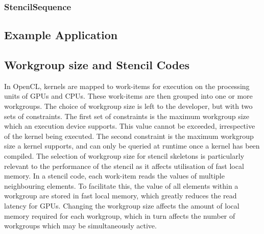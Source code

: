 


\subsubsection{StencilSequence}



\subsection{Example Application}



\subsection{Workgroup size and Stencil Codes}


In OpenCL, kernels are mapped to work-items for execution on the
processing units of GPUs and CPUs. These work-items are then grouped
into one or more workgroups. The choice of workgroup size is left to
the developer, but with two sets of constraints. The first set of
constraints is the maximum workgroup size which an execution device
supports. This value cannot be exceeded, irrespective of the kernel
being executed. The second constraint is the maximum workgroup size a
kernel supports, and can only be queried at runtime once a kernel has
been compiled. The selection of workgroup size for stencil skeletons
is particularly relevant to the performance of the stencil as it
affects utilisation of fast local memory. In a stencil code, each
work-item reads the values of multiple neighbouring elements. To
facilitate this, the value of all elements within a workgroup are
stored in fast local memory, which greatly reduces the read latency
for GPUs. Changing the workgroup size affects the amount of local
memory required for each workgroup, which in turn affects the number
of workgroups which may be simultaneously active. 

